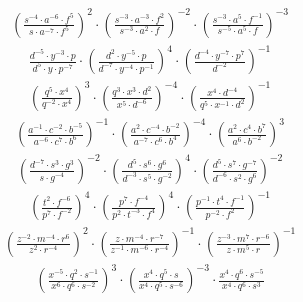 \begin{align}
\left(\frac{s^{-4}\cdot a^{-6}\cdot f^{5}}{s\cdot a^{-7}\cdot f^{5}}\right)^{2}\cdot \left(\frac{s^{-3}\cdot a^{-3}\cdot f^{2}}{s^{-3}\cdot a^{2}\cdot f}\right)^{-2}\cdot \left(\frac{s^{-3}\cdot a^{5}\cdot f^{-1}}{s^{-5}\cdot a^{5}\cdot f}\right)^{-3}
\end{align}
\begin{align}
\frac{d^{-5}\cdot y^{-3}\cdot p}{d^{5}\cdot y\cdot p^{-7}}\cdot \left(\frac{d^{2}\cdot y^{-5}\cdot p}{d^{-7}\cdot y^{-4}\cdot p^{-1}}\right)^{4}\cdot \left(\frac{d^{-4}\cdot y^{-7}\cdot p^{7}}{d^{-2}}\right)^{-1}
\end{align}
\begin{align}
\left(\frac{q^{5}\cdot x^{4}}{q^{-2}\cdot x^{4}}\right)^{3}\cdot \left(\frac{q^{3}\cdot x^{3}\cdot d^{2}}{x^{5}\cdot d^{-6}}\right)^{-4}\cdot \left(\frac{x^{4}\cdot d^{-4}}{q^{5}\cdot x^{-1}\cdot d^{2}}\right)^{-1}
\end{align}
\begin{align}
\left(\frac{a^{-1}\cdot c^{-2}\cdot b^{-5}}{a^{-6}\cdot c^{7}\cdot b^{6}}\right)^{-1}\cdot \left(\frac{a^{2}\cdot c^{-4}\cdot b^{-2}}{a^{-7}\cdot c^{6}\cdot b^{4}}\right)^{-4}\cdot \left(\frac{a^{2}\cdot c^{4}\cdot b^{7}}{a^{6}\cdot b^{-2}}\right)^{3}
\end{align}
\begin{align}
\left(\frac{d^{-7}\cdot s^{3}\cdot g^{3}}{s\cdot g^{-4}}\right)^{-2}\cdot \left(\frac{d^{5}\cdot s^{6}\cdot g^{6}}{d^{-3}\cdot s^{5}\cdot g^{-2}}\right)^{4}\cdot \left(\frac{d^{5}\cdot s^{7}\cdot g^{-7}}{d^{-6}\cdot s^{2}\cdot g^{6}}\right)^{-2}
\end{align}
\begin{align}
\left(\frac{t^{2}\cdot f^{-6}}{p^{7}\cdot f^{-2}}\right)^{4}\cdot \left(\frac{p^{7}\cdot f^{-4}}{p^{2}\cdot t^{-3}\cdot f^{4}}\right)^{4}\cdot \left(\frac{p^{-1}\cdot t^{4}\cdot f^{-1}}{p^{-2}\cdot f^{2}}\right)^{-1}
\end{align}
\begin{align}
\left(\frac{z^{-2}\cdot m^{-4}\cdot r^{6}}{z^{2}\cdot r^{-4}}\right)^{2}\cdot \left(\frac{z\cdot m^{-4}\cdot r^{-7}}{z^{-1}\cdot m^{-6}\cdot r^{-4}}\right)^{-1}\cdot \left(\frac{z^{-3}\cdot m^{7}\cdot r^{-6}}{z\cdot m^{5}\cdot r}\right)^{-1}
\end{align}
\begin{align}
\left(\frac{x^{-5}\cdot q^{2}\cdot s^{-1}}{x^{6}\cdot q^{6}\cdot s^{-2}}\right)^{3}\cdot \left(\frac{x^{4}\cdot q^{5}\cdot s}{x^{4}\cdot q^{5}\cdot s^{-6}}\right)^{-3}\cdot \frac{x^{4}\cdot q^{6}\cdot s^{-5}}{x^{4}\cdot q^{6}\cdot s^{3}}
\end{align}

